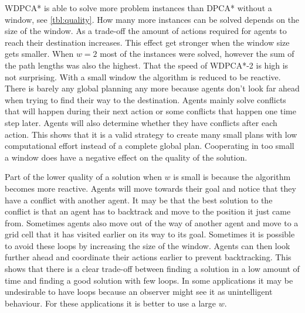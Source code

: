 WDPCA* is able to solve more problem instances than DPCA* without a window, see
\autoref{tbl:quality}. How many more instances can be solved depends on the
size of the window. As a trade-off the amount of actions required for agents to
reach their destination increases. This effect get stronger when the window
size gets smaller. When $w=2$ most of the instances were solved, however the
sum of the path lengths was also the highest. That the speed of WDPCA*-2 is
high is not surprising. With a small window the algorithm is reduced to be
reactive. There is barely any global planning any more because agents don't
look far ahead when trying to find their way to the destination. Agents mainly
solve conflicts that will happen during their next action or some conflicts
that happen one time step later. Agents will also determine whether they have
conflicts after each action. This shows that it is a valid strategy to create
many small plans with low computational effort instead of a complete global
plan. Cooperating in too small a window does have a negative effect on the
quality of the solution.

Part of the lower quality of a solution when $w$ is small is because the
algorithm becomes more reactive. Agents will move towards their goal and notice
that they have a conflict with another agent. It may be that the best solution
to the conflict is that an agent has to backtrack and move to the position it
just came from.
Sometimes agents also move out of the way of another agent and move to a grid
cell that it has visited earlier on its way to its goal. Sometimes it is
possible to avoid these loops by increasing the size of the window. Agents can
then look further ahead and coordinate their actions earlier to prevent
backtracking. This shows that there is a clear trade-off between finding a
solution in a low amount of time and finding a good solution with few loops. In
some applications it may be undesirable to have loops because an observer might
see it as unintelligent behaviour. For these applications it is better to use a
large $w$.


